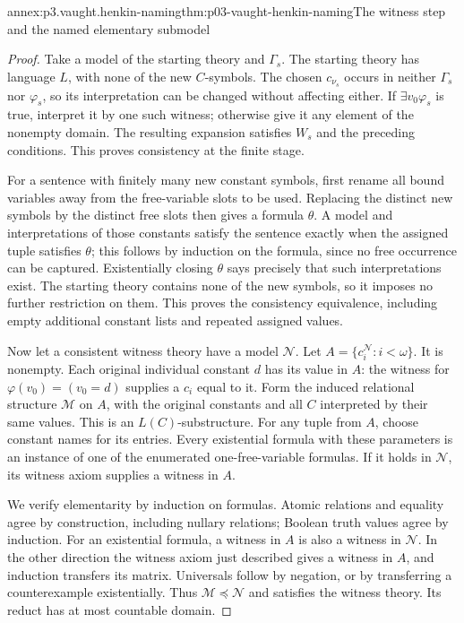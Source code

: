 \begin{annexitem}{annex:p3.vaught.henkin-naming}{thm:p03-vaught-henkin-naming}{The witness step and the named elementary submodel}
\begin{proof}
Take a model of the starting theory and \(\Gamma_s\).
The starting theory has language \(L\), with none of the new \(C\)-symbols.
The chosen \(c_{\nu_s}\) occurs in neither \(\Gamma_s\) nor
\(\varphi_s\), so its interpretation can be changed without affecting
either. If \(\exists v_0\varphi_s\) is true, interpret it by one such
witness; otherwise give it any element of the nonempty domain.
The resulting expansion satisfies \(W_s\) and the preceding conditions.
This proves consistency at the finite stage.

For a sentence with finitely many new constant symbols, first rename
all bound variables away from the free-variable slots to be used.
Replacing the distinct new symbols by the distinct free slots then
gives a formula \(\theta\). A model and interpretations of those
constants satisfy the sentence exactly when the assigned tuple satisfies
\(\theta\); this follows by induction on the formula, since no free
occurrence can be captured. Existentially closing \(\theta\) says
precisely that such interpretations exist. The starting theory contains
none of the new symbols, so it imposes no further restriction on them.
This proves the consistency equivalence, including empty additional
constant lists and repeated assigned values.

Now let a consistent witness theory have a model \(\mathcal N\).
Let \(A=\{c_i^{\mathcal N}:i<\omega\}\).
It is nonempty. Each original individual constant \(d\) has its
value in \(A\): the witness for \(\varphi(v_0)=(v_0=d)\) supplies
a \(c_i\) equal to it. Form the induced relational structure
\(\mathcal M\) on \(A\), with the original constants and all \(C\)
interpreted by their same values. This is an \(L(C)\)-substructure.
For any tuple from \(A\), choose constant names for its entries.
Every existential formula with these parameters is an instance
of one of the enumerated one-free-variable formulas.
If it holds in \(\mathcal N\), its witness axiom supplies a witness in \(A\).

We verify elementarity by induction on formulas. Atomic relations
and equality agree by construction, including nullary relations;
Boolean truth values agree by induction.
For an existential formula, a witness in \(A\) is also a witness in
\(\mathcal N\). In the other direction the witness axiom just described
gives a witness in \(A\), and induction transfers its matrix.
Universals follow by negation, or by transferring a counterexample
existentially. Thus \(\mathcal M\preccurlyeq\mathcal N\) and satisfies
the witness theory. Its reduct has at most countable domain.


\end{proof}
\end{annexitem}
